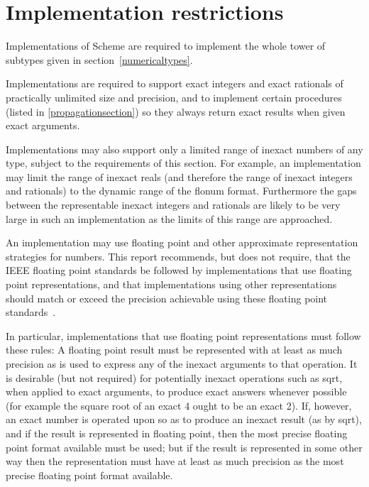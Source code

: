 \section{Implementation restrictions}

\label{restrictions}

\vest Implementations of Scheme are required to implement the whole
tower of subtypes given in section~\ref{numericaltypes}.

\vest Implementations are required to support
exact integers and exact rationals of
practically unlimited size and precision, and to implement
certain procedures (listed in \ref{propagationsection})
so they always return exact results when given exact
arguments.

\vest Implementations may also support only a limited range of
inexact numbers of
any type, subject to the requirements of this section.  For example,
an implementation may
limit the range of inexact reals (and therefore
the range of inexact integers and rationals)
to the dynamic range of the flonum format.
Furthermore
the gaps between the representable inexact integers and
rationals are
likely to be very large in such an implementation as the limits of this
range are approached.

\vest An implementation may use floating point and other approximate 
representation strategies for  numbers.
This report recommends, but does not require, that the IEEE 
floating point standards be followed by implementations that use
floating point representations, and that implementations using
other representations should match or exceed the precision achievable
using these floating point standards~\cite{IEEE}.

\vest In particular, implementations that use floating point
representations must follow these rules: A floating point result
must be represented with at least as much precision as is
used to express any of the inexact arguments to that operation.
It is desirable (but not required) for
potentially inexact operations such as {\cf sqrt}, when applied to exact
arguments, to produce exact answers whenever possible (for example the
square root of an exact 4 ought to be an exact 2).
If, however, an
exact number is operated upon so as to produce an inexact result
(as by {\cf sqrt}), and if the result is represented in floating
point, then the most precise floating point format available
must be used; but if the result
is represented in some other way then the representation must have
at least as much precision as the most precise
floating point format available.

